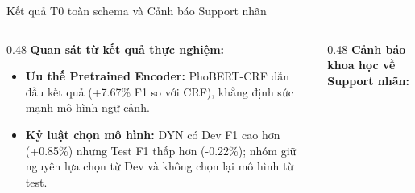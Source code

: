 \documentclass[aspectratio=169, 9pt]{beamer}
\begin{document}
\begin{frame}{Kết quả T0 toàn schema và Cảnh báo Support nhãn}
  \vspace{-0.15cm}
  \begin{center}
  \end{center}
  \vspace{0.08cm}
  {\fontsize{8.5pt}{10.8pt}\selectfont
  \begin{columns}[T]
    \begin{column}{0.48\textwidth}
      \textbf{Quan sát từ kết quả thực nghiệm:}
      \begin{itemize}
        \setlength{\itemsep}{2.5pt}
        \item \textbf{Ưu thế Pretrained Encoder:} PhoBERT-CRF dẫn đầu kết quả (+7.67\% F1 so với CRF), khẳng định sức mạnh mô hình ngữ cảnh.
        \item \textbf{Kỷ luật chọn mô hình:} DYN có Dev F1 cao hơn (+0.85\%) nhưng Test F1 thấp hơn (-0.22\%); nhóm giữ nguyên lựa chọn từ Dev và không chọn lại mô hình từ test.
      \end{itemize}
    \end{column}
    \begin{column}{0.48\textwidth}
      \textbf{Cảnh báo khoa học về Support nhãn:}
      \begin{itemize}
        \setlength{\itemsep}{2.5pt}

\end{itemize}
\end{column}
\end{columns}}
\end{frame}
\end{document}
